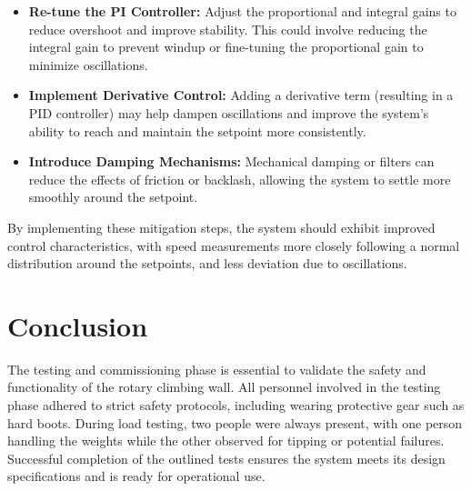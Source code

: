 \begin{itemize}
    \item \textbf{Re-tune the PI Controller:} Adjust the proportional and integral gains to reduce overshoot and improve stability. This could involve reducing the integral gain to prevent windup or fine-tuning the proportional gain to minimize oscillations.
    \item \textbf{Implement Derivative Control:} Adding a derivative term (resulting in a PID controller) may help dampen oscillations and improve the system's ability to reach and maintain the setpoint more consistently.
    \item \textbf{Introduce Damping Mechanisms:} Mechanical damping or filters can reduce the effects of friction or backlash, allowing the system to settle more smoothly around the setpoint.
\end{itemize}

By implementing these mitigation steps, the system should exhibit improved control characteristics, with speed measurements more closely following a normal distribution around the setpoints, and less deviation due to oscillations.




\section{Conclusion}
The testing and commissioning phase is essential to validate the safety and functionality of the rotary climbing wall. All personnel involved in the testing phase adhered to strict safety protocols, including wearing protective gear such as hard boots. During load testing, two people were always present, with one person handling the weights while the other observed for tipping or potential failures. Successful completion of the outlined tests ensures the system meets its design specifications and is ready for operational use.
